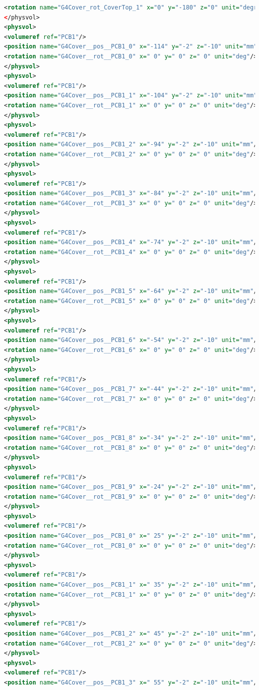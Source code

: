\begin{lstlisting}[language=XML, firstline=1, lastline=89]
<rotation name="G4Cover_rot_CoverTop_1" x="0" y="-180" z="0" unit="degree"/>
</physvol>
<physvol>
<volumeref ref="PCB1"/>
<position name="G4Cover__pos__PCB1_0" x="-114" y="-2" z="-10" unit="mm"/>
<rotation name="G4Cover__rot__PCB1_0" x=" 0" y=" 0" z=" 0" unit="deg"/>
</physvol>
<physvol>
<volumeref ref="PCB1"/>
<position name="G4Cover__pos__PCB1_1" x="-104" y="-2" z="-10" unit="mm"/>
<rotation name="G4Cover__rot__PCB1_1" x=" 0" y=" 0" z=" 0" unit="deg"/>
</physvol>
<physvol>
<volumeref ref="PCB1"/>
<position name="G4Cover__pos__PCB1_2" x="-94" y="-2" z="-10" unit="mm"/>
<rotation name="G4Cover__rot__PCB1_2" x=" 0" y=" 0" z=" 0" unit="deg"/>
</physvol>
<physvol>
<volumeref ref="PCB1"/>
<position name="G4Cover__pos__PCB1_3" x="-84" y="-2" z="-10" unit="mm"/>
<rotation name="G4Cover__rot__PCB1_3" x=" 0" y=" 0" z=" 0" unit="deg"/>
</physvol>
<physvol>
<volumeref ref="PCB1"/>
<position name="G4Cover__pos__PCB1_4" x="-74" y="-2" z="-10" unit="mm"/>
<rotation name="G4Cover__rot__PCB1_4" x=" 0" y=" 0" z=" 0" unit="deg"/>
</physvol>
<physvol>
<volumeref ref="PCB1"/>
<position name="G4Cover__pos__PCB1_5" x="-64" y="-2" z="-10" unit="mm"/>
<rotation name="G4Cover__rot__PCB1_5" x=" 0" y=" 0" z=" 0" unit="deg"/>
</physvol>
<physvol>
<volumeref ref="PCB1"/>
<position name="G4Cover__pos__PCB1_6" x="-54" y="-2" z="-10" unit="mm"/>
<rotation name="G4Cover__rot__PCB1_6" x=" 0" y=" 0" z=" 0" unit="deg"/>
</physvol>
<physvol>
<volumeref ref="PCB1"/>
<position name="G4Cover__pos__PCB1_7" x="-44" y="-2" z="-10" unit="mm"/>
<rotation name="G4Cover__rot__PCB1_7" x=" 0" y=" 0" z=" 0" unit="deg"/>
</physvol>
<physvol>
<volumeref ref="PCB1"/>
<position name="G4Cover__pos__PCB1_8" x="-34" y="-2" z="-10" unit="mm"/>
<rotation name="G4Cover__rot__PCB1_8" x=" 0" y=" 0" z=" 0" unit="deg"/>
</physvol>
<physvol>
<volumeref ref="PCB1"/>
<position name="G4Cover__pos__PCB1_9" x="-24" y="-2" z="-10" unit="mm"/>
<rotation name="G4Cover__rot__PCB1_9" x=" 0" y=" 0" z=" 0" unit="deg"/>
</physvol>
<physvol>
<volumeref ref="PCB1"/>
<position name="G4Cover__pos__PCB1_0" x=" 25" y="-2" z="-10" unit="mm"/>
<rotation name="G4Cover__rot__PCB1_0" x=" 0" y=" 0" z=" 0" unit="deg"/>
</physvol>
<physvol>
<volumeref ref="PCB1"/>
<position name="G4Cover__pos__PCB1_1" x=" 35" y="-2" z="-10" unit="mm"/>
<rotation name="G4Cover__rot__PCB1_1" x=" 0" y=" 0" z=" 0" unit="deg"/>
</physvol>
<physvol>
<volumeref ref="PCB1"/>
<position name="G4Cover__pos__PCB1_2" x=" 45" y="-2" z="-10" unit="mm"/>
<rotation name="G4Cover__rot__PCB1_2" x=" 0" y=" 0" z=" 0" unit="deg"/>
</physvol>
<physvol>
<volumeref ref="PCB1"/>
<position name="G4Cover__pos__PCB1_3" x=" 55" y="-2" z="-10" unit="mm"/>

\end{lstlisting}
